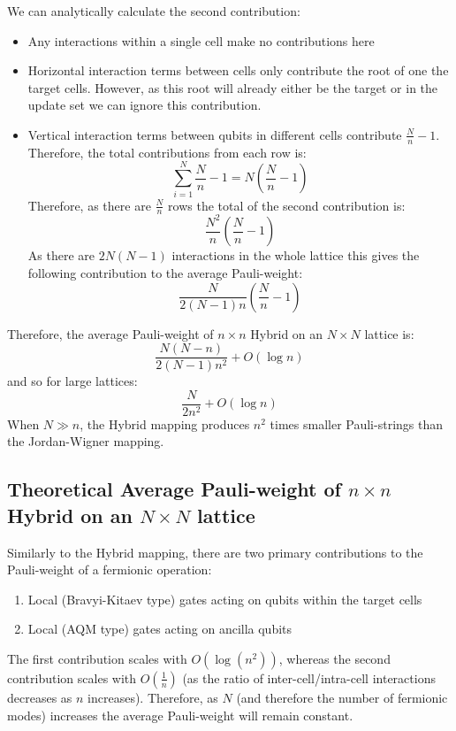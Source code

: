 \documentclass[pdftex,pra,aps,twocolumn,twoside]{revtex4-2}
\theoremstyle{plain}
\theoremstyle{note}
\newcommand\+{{\footnotesize \raisebox{0.3ex}{+}}}
\begin{document}
We can analytically calculate the second contribution:
\begin{itemize}
    \item Any interactions within a single cell make no contributions here
    \item Horizontal interaction terms between cells only contribute the root of one the target cells. However, as this root will already either be the target or in the update set we can ignore this contribution.
    \item Vertical interaction terms between qubits in different cells contribute $\frac{N}{n} -1$. Therefore, the total contributions from each row is:
    \begin{equation}
            \sum_{i=1}^{N} \frac{N}{n} -1 = N\left(\frac{N}{n} -1\right)
    \end{equation}
    Therefore, as there are $\frac{N}{n}$ rows the total of the second contribution is:
    \begin{equation}
        \frac{N^2}{n}\left(\frac{N}{n}-1\right)
    \end{equation}
    As there are $2N(N - 1)$ interactions in the whole lattice this gives the following contribution to the average Pauli-weight:
    \begin{equation}
        \frac{N}{2(N-1)n}\left(\frac{N}{n}-1\right)
    \end{equation}
\end{itemize}
Therefore, the average Pauli-weight of $n\times n$ Hybrid on an $N\times N$ lattice is:
\begin{equation}
        \frac{N(N-n)}{2(N-1)n^2} + O(\log n) 
\end{equation}
and so for large lattices:
\begin{equation}
        \frac{N}{2n^2} + O(\log n) 
\end{equation}
When $N\gg n$, the Hybrid mapping produces $n^2$ times smaller Pauli-strings than the Jordan-Wigner mapping.
\subsection{Theoretical Average Pauli-weight of $n\times n$ Hybrid\+ on an $N\times N$ lattice}
Similarly to the Hybrid mapping, there are two primary contributions to the Pauli-weight of a fermionic operation:
\begin{enumerate}
    \item Local (Bravyi-Kitaev type) gates acting on qubits within the target cells
    \item Local (AQM type) gates acting on ancilla qubits
\end{enumerate}
The first contribution scales with $O(\log(n^2))$, whereas the second contribution scales with $O(\frac{1}{n})$ (as the ratio of inter-cell/intra-cell interactions decreases as $n$ increases). Therefore, as $N$ (and therefore the number of fermionic modes) increases the average Pauli-weight will remain constant.
\end{document}
